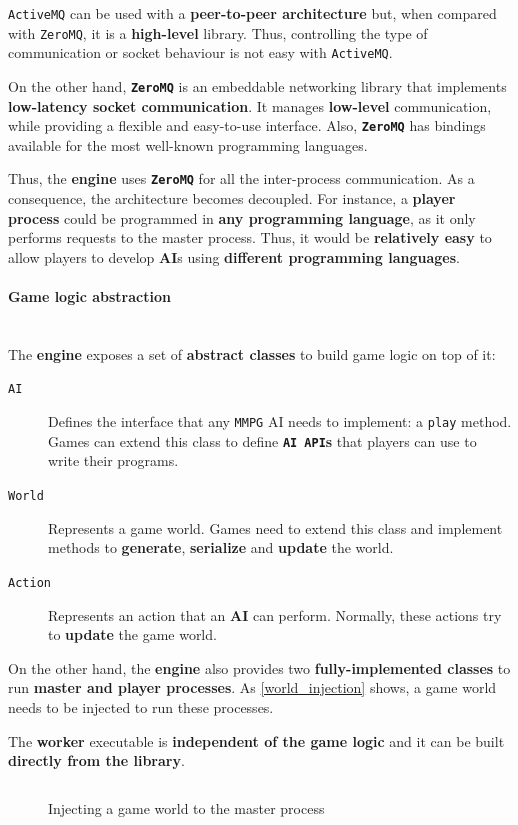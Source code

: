 \documentclass[a4paper,11pt,titlepage,abstract,numbers=noenddot,automark,mnsy,intlimits,rgb,dvipsnames]{report}
\begin{document}
\texttt{ActiveMQ} can be used with a \textbf{peer-to-peer architecture} but, when compared with \texttt{ZeroMQ}, it is a
\textbf{high-level} library. Thus, controlling the type of communication or socket behaviour is not easy with \texttt{ActiveMQ}.

On the other hand, \textbf{\texttt{ZeroMQ}} \cite{zeromq} is an embeddable networking library that implements \textbf{low-latency socket communication}. It manages
\textbf{low-level} communication, while providing a flexible and easy-to-use interface. Also, \textbf{\texttt{ZeroMQ}} has bindings available
for the most well-known programming languages.

Thus, the \textbf{engine} uses \textbf{\texttt{ZeroMQ}} for all the inter-process communication. As a consequence, the architecture becomes
decoupled. For instance, a \textbf{player process} could be programmed in \textbf{any programming language}, as it
only performs requests to the master process. Thus, it would be \textbf{relatively easy} to allow players to develop
\textbf{AI}s using \textbf{different programming languages}.
\paragraph{Game logic abstraction}
\hfill
\\[0.2cm]
\indent
The \textbf{engine} exposes a set of \textbf{abstract classes} to build game logic on top of it:
\begin{description}
\item[\texttt{AI}]
Defines the interface that any \texttt{MMPG} AI needs to implement: a \texttt{play} method. Games can extend
  this class to define \textbf{\texttt{AI API}s} that players can use to write their programs.
\item[\texttt{World}]
Represents a game world. Games need to extend this class and implement methods to
  \textbf{generate}, \textbf{serialize} and \textbf{update} the world.
\item[\texttt{Action}]
Represents an action that an \textbf{AI} can perform. Normally, these actions try to \textbf{update}
  the game world.
\end{description}
On the other hand, the \textbf{engine} also provides two \textbf{fully-implemented classes} to run \textbf{master and player
processes}. As \autoref{world_injection} shows, a game world needs to be injected to run these processes.

The \textbf{worker} executable is \textbf{independent of the game logic} and it can be built \textbf{directly from the library}.
\begin{figure}[H]
\inputminted[linenos,fontsize=\small,frame=lines,framesep=2mm]{c++}{code/master.cpp}
\caption{Injecting a game world to the master process}
\label{world_injection}
\end{figure}
\clearpage
\end{document}
